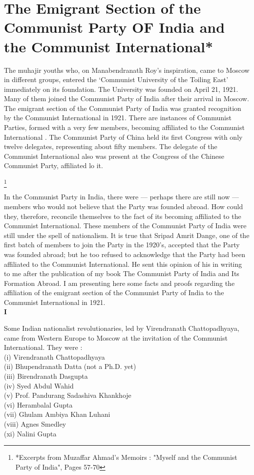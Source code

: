 \section{The Emigrant Section of the Communist Party OF India and the Communist International*}

The muhajir youths who, on Manabendranath Roy’s inspiration, came to Moscow in different groups, entered the ‘Communist University of the Toiling East’ immediately on its foundation. The University was founded on April 21, 1921. Many of them joined the Communist Party of India after their arrival in Moscow. The emigrant section of the Communist Party of India was granted recognition by the Communist International in 1921. There are instances of Communist Parties, formed with a very few members, becoming affiliated to the Communist International . The Communist Party of China held its first Congress with only twelve delegates, representing about fifty members. The delegate of the Communist International also was present at the Congress of the Chinese Communist Party, affiliated lo it. 


\footnote{*Excerpts from Muzaffar Ahmad’s Memoirs : "Myself and the Communist Party of India", Pages 57-70 }


In the Communist Party in India, there were — perhaps there are still now — members who would not believe that the Party was founded abroad. How could they, therefore, reconcile themselves to the fact of its becoming affiliated to the Communist International. These members of the Communist Party of India were still under the spell of nationalism. It is true that Sripad Amrit Dange, one of the first batch of members to join the Party in the 1920’s, accepted that the Party was founded abroad; but he too refused to acknowledge that the Party had been affiliated to the Communist International. He sent this opinion of his in writing to me after the publication of my book The Communist Party of India and Its Formation Abroad. I am presenting here some facts and proofs regarding the affiliation of the emigrant section of the Communist Party of India to the Communist International in 1921.\\ 

{\textbf{I}}

Some Indian nationalist revolutionaries, led by Virendranath Chattopadhyaya, came from Western Europe to Moscow at the invitation of the Communist International. They were :\\

\indent(i) Virendranath Chattopadhyaya \\
\indent(ii) Bhupendranath Datta (not a Ph.D. yet) \\
\indent(iii) Birendranath Dasgupta \\
\indent(iv) Syed Abdul Wahid \\
\indent(v) Prof. Pandurang Sadashiva Khankhoje \\
\indent(vi) Herambalal Gupta \\
\indent(vii) Ghulam Ambiya Khan Luhani \\
\indent(viii) Agnes Smedley \\
\indent(xi) Nalini Gupta \\

